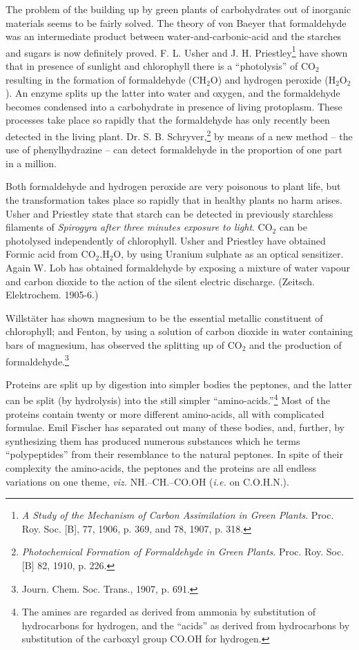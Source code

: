 \documentclass[a4paper, 12pt, oneside]{article}
\begin{document}
The problem of the building up by green plants of carbohydrates out of inorganic materials seems to be fairly solved. The theory of von Baeyer that formaldehyde was an intermediate product between water-and-carbonic-acid and the starches and sugars is now definitely proved. F. L. Usher and J. H. Priestley\footnote{\emph{A Study of the Mechanism of Carbon Assimilation in Green Plants}. Proc. Roy. Soc. [B], 77, 1906, p. 369, and 78, 1907, p. 318.} have shown that in presence of sunlight and chlorophyll there is a ``photolysis'' of CO$_{2}$ resulting in the formation of formaldehyde (CH$_{2}$O) and hydrogen peroxide (H$_{2}$O$_{2}$). An enzyme splits up the latter into water and oxygen, and the formaldehyde becomes condensed into a carbohydrate in presence of living protoplasm. These processes take place so rapidly that the formaldehyde has only recently been detected in the living plant. Dr. S. B. Schryver,\footnote{\emph{Photochemical Formation of Formaldehyde in Green Plants}. Proc. Roy. Soc. [B] 82, 1910, p. 226.} by means of a new method -- the use of phenylhydrazine -- can detect formaldehyde in the proportion of one part in a million.

Both formaldehyde and hydrogen peroxide are very poisonous to plant life, but the transformation takes place so rapidly that in healthy plants no harm arises. Usher and Priestley state that starch can be detected in previously starchless filaments of \emph{Spirogyra after three minutes exposure to light}. CO$_{2}$ can be photolysed independently of chlorophyll. Usher and Priestley have obtained Formic acid from CO$_{2}$.H$_{2}$O, by using Uranium sulphate as an optical sensitizer. Again W. Lob has obtained formaldehyde by exposing a mixture of water vapour and carbon dioxide to the action of the silent electric discharge. (Zeitsch. Elektrochem. 1905-6.)

Willstäter has shown magnesium to be the essential metallic constituent of chlorophyll; and Fenton, by using a solution of carbon dioxide in water containing bars of magnesium, has observed the splitting up of CO$_{2}$ and the production of formaldehyde.\footnote{Journ. Chem. Soc. Trans., 1907, p. 691.}

Proteins are split up by digestion into simpler bodies the peptones, and the latter can be split (by hydrolysis) into the still simpler ``amino-acids.''\footnote{The amines are regarded as derived from ammonia by substitution of hydrocarbons for hydrogen, and the ``acids'' as derived from hydrocarbons by substitution of the carboxyl group CO.OH for hydrogen.} Most of the proteins contain twenty or more different amino-acids, all with complicated formulae. Emil Fischer has separated out many of these bodies, and, further, by synthesizing them has produced numerous substances which he terms ``polypeptides'' from their resemblance to the natural peptones. In spite of their complexity the amino-acids, the peptones and the proteins are all endless variations on one theme, \emph{viz.} NH.--CH.--CO.OH (\emph{i.e.} on C.O.H.N.).
\end{document}
